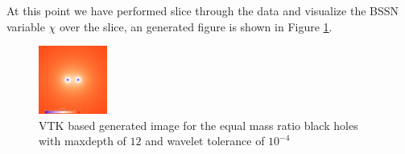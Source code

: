 At this point we have performed slice through the data and visualize the BSSN variable $\chi$ over the slice, an generated figure is shown in Figure \ref{fig:vtk:r1}. 

\begin{figure}[H]
    \centering
    \includegraphics[width=0.2\textwidth]{figs/vtk/r1/img_slice_000000.png}
    \caption{VTK based generated image for the equal mass ratio black holes with maxdepth of $12$ and wavelet tolerance of $10^{-4}$ \label{fig:vtk:r1}}
\end{figure}

